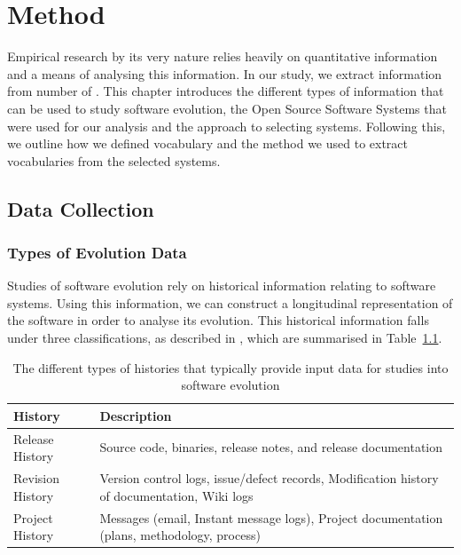 \chapter{Method}
\label{chapter:Method}

Empirical research by its very nature relies heavily on quantitative information and a means of analysing this information. In our study, we extract information from number of \OSYS. This chapter introduces the different types of information that can be used to study software evolution, the Open Source Software Systems that were used for our analysis and the approach to selecting systems. Following this, we outline how we defined vocabulary and the method we used to extract vocabularies from the selected systems.

\section{Data Collection} %
\label{sec:data_collection}




\subsection{Types of Evolution Data} %
\label{sub:types_of_evolution_data}


Studies of software evolution rely on historical information relating to software systems. Using this information, we can construct a longitudinal representation of the software in order to analyse its evolution. This historical information falls under three classifications, as described in \cite{Vasa10a}, which are summarised in Table~\ref{tab:Histories}.

\begin{table}[t]
\centering
\begin{tabular}{|p{}|p{}|}
\hline
{\bf History} & {\bf Description}\\
\hline \hline
Release History & Source code, binaries, release notes, and release documentation\\
\hline
Revision History & Version control logs, issue/defect records, Modification history of documentation, Wiki logs\\
\hline
Project History & Messages (email, Instant message logs), Project documentation (plans, methodology, process)\\
\hline
\end{tabular}
\vspace{0.2cm}
\caption{The different types of histories that typically provide input data for studies into software evolution}
\label{tab:Histories}
\vspace{-0.2cm}
\end{table}

